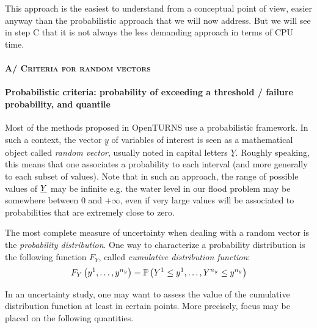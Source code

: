 This approach is the easiest to understand from a conceptual point of view, easier anyway than the probabilistic approach that we will now address. But we will see in step C that it is not always the less demanding approach in terms of CPU time.

\paragraph{\textsc{A/ Criteria for random vectors}}
\par


\paragraph{Probabilistic criteria: probability of exceeding a threshold / failure probability, and quantile}
\par

Most of the methods proposed in OpenTURNS use a probabilistic framework. In such a context, the vector $\underline{y}$ of variables of interest is seen as a mathematical object called {\em random vector}, usually noted in capital letters $\underline{Y}$. Roughly speaking, this means that one associates a probability to each interval (and more generally to each subset of values). Note that in such an approach, the range of possible values of ${\underline{Y}}$ may be infinite e.g. the water level in our flood problem may be somewhere between 0 and $+\infty$, even if very large values will be associated to probabilities that are extremely close to zero.

The most complete measure of uncertainty when dealing with a random vector is the {\em probability distribution}. One way to characterize a probability distribution is the following function $F_Y$, called {\em cumulative distribution function}:
\begin{align*}
  F_Y \left( y^1,\ldots,y^{n_y} \right) = {\mathbb P}\left( Y^1 \leq y^1,\ldots, Y^{n_y} \leq y^{n_y} \right)
\end{align*}

In an uncertainty study, one may want to assess the value of the cumulative distribution function at least in certain points. More precisely, focus may be placed on the following quantities.

